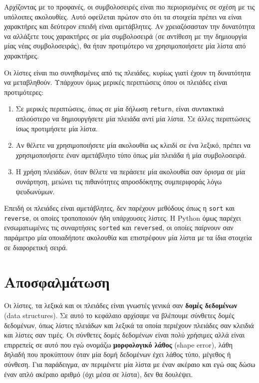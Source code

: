 \documentclass[10pt]{book}
\begin{document}
Αρχίζοντας με το προφανές, οι συμβολοσειρές είναι πιο περιορισμένες σε σχέση με τις υπόλοιπες ακολουθίες. Αυτό οφείλεται πρώτον στο ότι τα στοιχεία πρέπει να είναι χαρακτήρες και δεύτερον επειδή είναι αμετάβλητες. Αν χρειαζόσασταν την δυνατότητα να αλλάξετε τους χαρακτήρες σε μία συμβολοσειρά (σε αντίθεση με την δημιουργία μίας νέας συμβολοσειράς), θα ήταν προτιμότερο να χρησιμοποιήσετε μία λίστα από χαρακτήρες.

Οι λίστες είναι πιο συνηθισμένες από τις πλειάδες, κυρίως γιατί έχουν τη δυνατότητα να μεταβληθούν. Υπάρχουν όμως μερικές περιπτώσεις όπου οι πλειάδες είναι προτιμότερες:

\begin{enumerate}

\item  Σε μερικές περιπτώσεις, όπως σε μία δήλωση {\tt return}, είναι συντακτικά απλούστερο να δημιουργήσετε μία πλειάδα αντί μία λίστα. Σε άλλες περιπτώσεις ίσως προτιμήσετε μία λίστα.

\item  Αν θέλετε να χρησιμοποιήσετε μία ακολουθία ως κλειδί σε ένα λεξικό, πρέπει να χρησιμοποιήσετε έναν αμετάβλητο τύπο όπως μία πλειάδα ή μία συμβολοσειρά. 

\item  Η χρήση πλειάδων, όταν θέλετε να περάσετε μία ακολουθία σαν όρισμα σε μία συνάρτηση, μειώνει τις πιθανότητες απροσδόκητης συμπεριφοράς λόγω ψευδωνύμων.

\end{enumerate}

Επειδή οι πλειάδες είναι αμετάβλητες, δεν παρέχουν μεθόδους όπως η  {\tt sort}  και {\tt reverse}, οι οποίες τροποποιούν ήδη υπάρχουσες λίστες. Η Python όμως παρέχει ενσωματωμένες τις συναρτήσεις {\tt sorted} και {\tt reversed}, οι οποίες παίρνουν σαν παράμετρο μία οποιαδήποτε ακολουθία και επιστρέφουν μία λίστα με τα ίδια στοιχεία σε διαφορετική σειρά.
 


\section{Αποσφαλμάτωση}

Οι λίστες, τα λεξικά και οι πλειάδες είναι γνωστές γενικά σαν {\bf δομές δεδομένων} (data structures). Σε αυτό το κεφάλαιο αρχίσαμε να βλέπουμε σύνθετες δομές δεδομένων, όπως λίστες πλειάδων και λεξικά τα οποία περιέχουν πλειάδες σαν κλειδιά και λίστες σαν τιμές. Οι σύνθετες δομές δεδομένων είναι πολύ χρήσιμες αλλά είναι επιρρεπείς σε αυτό που εγώ ονομάζω {\bf μορφολογικό λάθος} (shape error), λάθη δηλαδή που προκύπτουν όταν μία δομή δεδομένων έχει λάθος τύπο, μέγεθος ή σύνθεση. Για παράδειγμα, αν περιμένετε μία λίστα με έναν ακέραιο και εγώ σας δώσω έναν απλό ακέραιο αριθμό (όχι μέσα σε λίστα), δεν θα δουλέψει.
\end{document}
